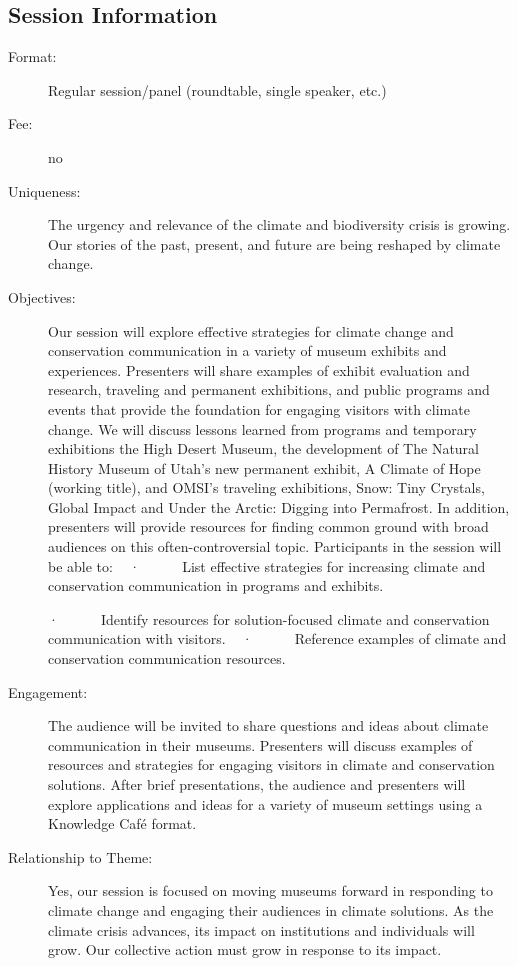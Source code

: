 \documentclass{report}
\begin{document}
              \subsection*{Session Information}
                \begin{description}
                  \item [Format:] Regular session/panel (roundtable, single speaker, etc.)
							    
								  \item [Fee:]no
							     
							    \item [Uniqueness:]The urgency and relevance of the climate and biodiversity crisis is growing. Our stories of the past, present, and future are being reshaped by climate change.
							    \item [Objectives:]Our session will explore effective strategies for climate change and conservation communication in a variety of museum exhibits and experiences. Presenters will share examples of exhibit evaluation and research, traveling and permanent exhibitions, and public programs and events that provide the foundation for engaging visitors with climate change. We will discuss lessons learned from programs and temporary exhibitions the High Desert Museum, the development of The Natural History Museum of Utah’s new permanent exhibit, A Climate of Hope (working title), and OMSI’s traveling exhibitions, Snow: Tiny Crystals, Global Impact and Under the Arctic: Digging into Permafrost. In addition, presenters will provide resources for finding common ground with broad audiences on this often-controversial topic. Participants in the session will be able to:
 
·      List effective strategies for increasing climate and conservation communication in programs and exhibits.

·      Identify resources for solution-focused climate and conservation communication with visitors.
 
·      Reference examples of climate and conservation communication resources.
							    \item [Engagement:]The audience will be invited to share questions and ideas about climate communication in their museums. Presenters will discuss examples of resources and strategies for engaging visitors in climate and conservation solutions. After brief presentations, the audience and presenters will explore applications and ideas for a variety of museum settings using a Knowledge Café format.
							    \item [Relationship to Theme:]Yes, our session is focused on moving museums forward in responding to climate change and engaging their audiences in climate solutions. As the climate crisis advances, its impact on institutions and individuals will grow. Our collective action must grow in response to its impact.
							    
                \end{description}
\end{document}
